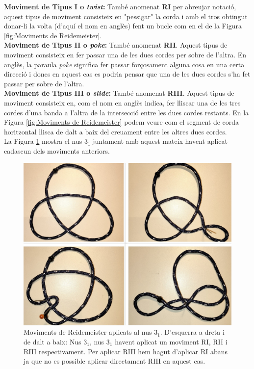 \noindent
\textbf{Moviment de Tipus I o \textit{twist}:} També anomenat \textbf{RI} per abreujar notació, aquest tipus de moviment consisteix en "pessigar" la corda i amb el tros obtingut donar-li la volta (d'aquí el nom en anglès) fent un bucle com en el de la Figura \ref{fig:Moviments de Reidemeister}.\\

\noindent
\textbf{Moviment de Tipus II o \textit{poke}:} També anomenat \textbf{RII}. Aquest tipus de moviment consisteix en fer passar una de les dues cordes per sobre de l'altra. En anglès, la paraula \textit{poke} significa fer passar forçosament alguna cosa en una certa direcció i doncs en aquest cas es podria pensar que una de les dues cordes s'ha fet passar per sobre de l'altra.\\

\noindent
\textbf{Moviment de Tipus III o \textit{slide}:} També anomenat \textbf{RIII}. Aquest tipus de moviment consisteix en, com el nom en anglès indica, fer lliscar una de les tres cordes d'una banda a l'altra de la intersecció entre les dues cordes restants. En la Figura \ref{fig:Moviments de Reidemeister} podem veure com el segment de corda horitzontal llisca de dalt a baix del creuament entre les altres dues cordes.\\

La Figura \ref{fig:movimentsdereidemeisteraltrefoil} mostra el nus $3_1$ juntament amb aquest mateix havent aplicat cadascun dels moviments anteriors.\\

\begin{figure}
	\centering
	\includegraphics[width=\linewidth]{img/moviments de reidemeister (2).jpg}
	\caption{Moviments de Reidemeister aplicats al nus $3_1$. D'esquerra a dreta i de dalt a baix: Nus $3_1$, nus $3_1$ havent aplicat un moviment RI, RII i RIII respectivament. Per aplicar RIII hem hagut d'aplicar RI abans ja que no es possible aplicar directament RIII en aquest cas.}\label{fig:movimentsdereidemeisteraltrefoil}
\end{figure}

